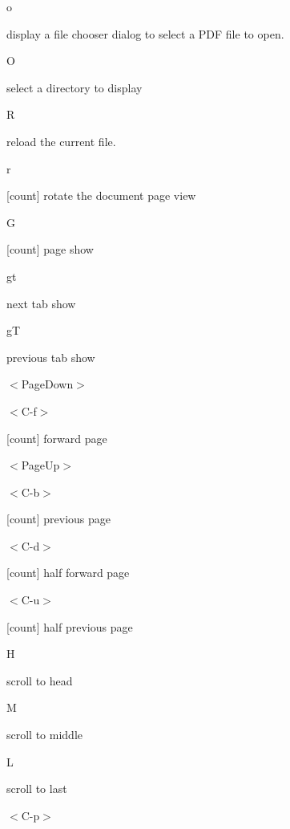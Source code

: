 \documentclass[a4paper,12pt]{article}
\begin{document}
\begin{description}

\item o

display a file chooser dialog to select a PDF file to open.

\item O

select a directory to display

\item R

reload the current file.

\item r

[count] rotate the document page view

\item G

[count] page show

\item gt

next tab show

\item gT

previous tab show

\item $<$PageDown$>$

\item $<$C-f$>$

[count] forward page 

\item $<$PageUp$>$

\item $<$C-b$>$

[count] previous page 

\item $<$C-d$>$

[count] half forward page 

\item $<$C-u$>$

[count] half previous page 

\item H

scroll to head

\item M

scroll to middle

\item L

scroll to last

\item $<$C-p$>$


\end{description}
\end{document}
